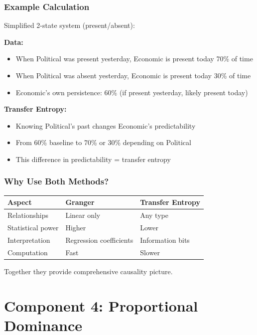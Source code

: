 \documentclass[11pt]{article}
\begin{document}
\subsubsection{Example Calculation}

Simplified 2-state system (present/absent):

\textbf{Data:}
\begin{itemize}
    \item When Political was present yesterday, Economic is present today 70\% of time
    \item When Political was absent yesterday, Economic is present today 30\% of time
    \item Economic's own persistence: 60\% (if present yesterday, likely present today)
\end{itemize}

\textbf{Transfer Entropy:}
\begin{itemize}
    \item Knowing Political's past changes Economic's predictability
    \item From 60\% baseline to 70\% or 30\% depending on Political
    \item This difference in predictability = transfer entropy
\end{itemize}

\subsubsection{Why Use Both Methods?}

\begin{center}
\begin{tabular}{lll}
\toprule
\textbf{Aspect} & \textbf{Granger} & \textbf{Transfer Entropy} \\
\midrule
Relationships & Linear only & Any type \\
Statistical power & Higher & Lower \\
Interpretation & Regression coefficients & Information bits \\
Computation & Fast & Slower \\
\bottomrule
\end{tabular}
\end{center}

Together they provide comprehensive causality picture.

\section{Component 4: Proportional Dominance}
\end{document}
